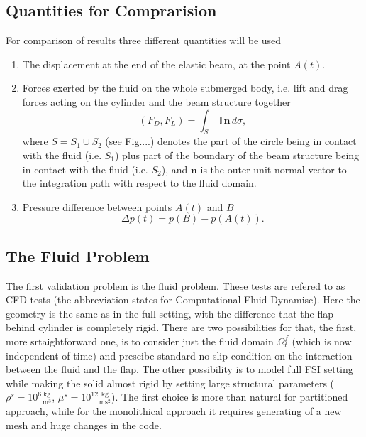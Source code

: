 \subsection{Quantities for Comprarision}
For comparison of results three different quantities will be used
\begin{enumerate}
  \item The displacement at the end of the elastic beam, at the point $A(t)$.

  \item Forces exerted by the fluid on the whole submerged body, i.e. lift and
drag forces acting on the cylinder and the beam structure together 
    \begin{equation}\label{eq:forces}
      (F_D, F_L) = \int_S\,\mathbb{T}\mathbf{n}\,d\sigma,
    \end{equation}
    where $S = S_1 \cup S_2$ (see Fig....) denotes the part of the circle being in
contact with the fluid (i.e. $S_1$) plus part of the boundary of the beam
    structure being in contact with the fluid (i.e. $S_2$), and $\mathbf{n}$ is the outer unit
normal vector to the integration path with respect to the fluid domain.

  \item Pressure difference between points $A(t)$ and $B$
    \begin{equation}\label{eq:press_diff}
      \Delta p (t) = p(B) - p(A(t)).
    \end{equation}

\end{enumerate}



\subsection{The Fluid Problem}
The first validation problem is the fluid problem. These tests are refered to as CFD tests 
(the abbreviation states for Computational Fluid Dynamisc). Here the geometry is the same as in the
full setting, with the difference that the flap behind cylinder is completely rigid.
There are two possibilities for that, the first, more srtaightforward one, is to consider just the
fluid domain $\Omega_t^f$ (which is now independent of time) and prescibe standard no-slip condition
on the interaction between the fluid and the flap. The other possibility is to model
full FSI setting while making the solid almost rigid by setting large structural parameters
($\rho^s = 10^6 \frac{\mathrm{kg}}{\mathrm{m}^3}$, $\mu^s = 10^{12} \frac{\mathrm{kg}}{\mathrm{ms}^2}$).
The first choice is more than natural for partitioned approach, while for the 
monolithical approach it requires generating of a new mesh and huge changes in the code.

